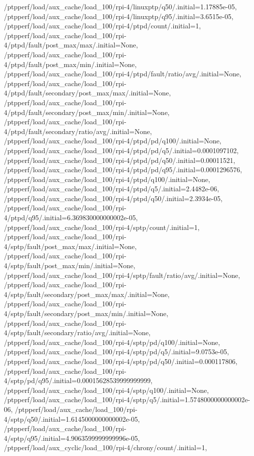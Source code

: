 {    /ptpperf/load/aux_cache/load_100/rpi-4/linuxptp/q50/.initial=1.17885e-05,
    /ptpperf/load/aux_cache/load_100/rpi-4/linuxptp/q95/.initial=3.6515e-05,
    /ptpperf/load/aux_cache/load_100/rpi-4/ptpd/count/.initial=1,
    /ptpperf/load/aux_cache/load_100/rpi-4/ptpd/fault/post_max/max/.initial=None,
    /ptpperf/load/aux_cache/load_100/rpi-4/ptpd/fault/post_max/min/.initial=None,
    /ptpperf/load/aux_cache/load_100/rpi-4/ptpd/fault/ratio/avg/.initial=None,
    /ptpperf/load/aux_cache/load_100/rpi-4/ptpd/fault/secondary/post_max/max/.initial=None,
    /ptpperf/load/aux_cache/load_100/rpi-4/ptpd/fault/secondary/post_max/min/.initial=None,
    /ptpperf/load/aux_cache/load_100/rpi-4/ptpd/fault/secondary/ratio/avg/.initial=None,
    /ptpperf/load/aux_cache/load_100/rpi-4/ptpd/pd/q100/.initial=None,
    /ptpperf/load/aux_cache/load_100/rpi-4/ptpd/pd/q5/.initial=0.0001097102,
    /ptpperf/load/aux_cache/load_100/rpi-4/ptpd/pd/q50/.initial=0.00011521,
    /ptpperf/load/aux_cache/load_100/rpi-4/ptpd/pd/q95/.initial=0.0001296576,
    /ptpperf/load/aux_cache/load_100/rpi-4/ptpd/q100/.initial=None,
    /ptpperf/load/aux_cache/load_100/rpi-4/ptpd/q5/.initial=2.4482e-06,
    /ptpperf/load/aux_cache/load_100/rpi-4/ptpd/q50/.initial=2.3934e-05,
    /ptpperf/load/aux_cache/load_100/rpi-4/ptpd/q95/.initial=6.369830000000002e-05,
    /ptpperf/load/aux_cache/load_100/rpi-4/sptp/count/.initial=1,
    /ptpperf/load/aux_cache/load_100/rpi-4/sptp/fault/post_max/max/.initial=None,
    /ptpperf/load/aux_cache/load_100/rpi-4/sptp/fault/post_max/min/.initial=None,
    /ptpperf/load/aux_cache/load_100/rpi-4/sptp/fault/ratio/avg/.initial=None,
    /ptpperf/load/aux_cache/load_100/rpi-4/sptp/fault/secondary/post_max/max/.initial=None,
    /ptpperf/load/aux_cache/load_100/rpi-4/sptp/fault/secondary/post_max/min/.initial=None,
    /ptpperf/load/aux_cache/load_100/rpi-4/sptp/fault/secondary/ratio/avg/.initial=None,
    /ptpperf/load/aux_cache/load_100/rpi-4/sptp/pd/q100/.initial=None,
    /ptpperf/load/aux_cache/load_100/rpi-4/sptp/pd/q5/.initial=9.0753e-05,
    /ptpperf/load/aux_cache/load_100/rpi-4/sptp/pd/q50/.initial=0.000117806,
    /ptpperf/load/aux_cache/load_100/rpi-4/sptp/pd/q95/.initial=0.00015628539999999999,
    /ptpperf/load/aux_cache/load_100/rpi-4/sptp/q100/.initial=None,
    /ptpperf/load/aux_cache/load_100/rpi-4/sptp/q5/.initial=1.5748000000000002e-06,
    /ptpperf/load/aux_cache/load_100/rpi-4/sptp/q50/.initial=1.6145000000000002e-05,
    /ptpperf/load/aux_cache/load_100/rpi-4/sptp/q95/.initial=4.9063599999999996e-05,
    /ptpperf/load/aux_cyclic/load_100/rpi-4/chrony/count/.initial=1,
}
